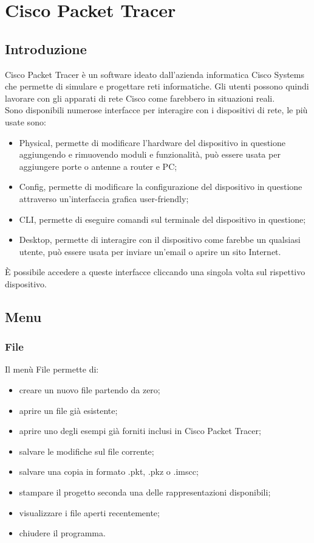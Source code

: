 \section{Cisco Packet Tracer}

\subsection{Introduzione}
Cisco Packet Tracer è un software ideato dall'azienda informatica Cisco Systems che permette di simulare e progettare reti informatiche. Gli utenti possono quindi lavorare con gli apparati di rete Cisco come farebbero in situazioni reali.\\
Sono disponibili numerose interfacce per interagire con i dispositivi di rete, le più usate sono:

\begin{itemize}
    \item Physical, permette di modificare l'hardware del dispositivo in questione aggiungendo e rimuovendo moduli e funzionalità, può essere usata per aggiungere porte o antenne a router e PC;
    \item Config, permette di modificare la configurazione del dispositivo in questione attraverso un'interfaccia grafica user-friendly;
    \item CLI, permette di eseguire comandi sul terminale del dispositivo in questione;
    \item Desktop, permette di interagire con il dispositivo come farebbe un qualsiasi utente, può essere usata per inviare un'email o aprire un sito Internet.
\end{itemize}

\noindent È possibile accedere a queste interfacce cliccando una singola volta sul rispettivo dispositivo.

\subsection{Menu}

\subsubsection{File}
Il menù File permette di: 

\begin{itemize}
    \item creare un nuovo file partendo da zero;
    \item aprire un file già esistente;
    \item aprire uno degli esempi già forniti inclusi in Cisco Packet Tracer;
    \item salvare le modifiche sul file corrente;
    \item salvare una copia in formato .pkt, .pkz o .imscc;
    \item stampare il progetto seconda una delle rappresentazioni disponibili;
    \item visualizzare i file aperti recentemente;
    \item chiudere il programma.
\end{itemize}

